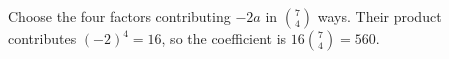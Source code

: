 Choose the four factors contributing $-2a$ in $\binom74$ ways. Their product contributes $(-2)^4=16$, so the coefficient is $16\binom74=\boxed{560}$.
